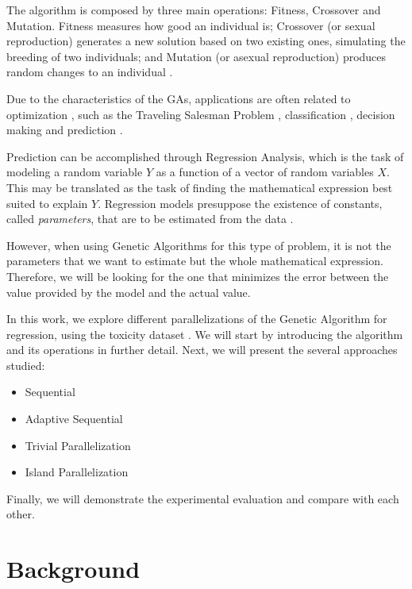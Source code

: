 \documentclass[runningheads]{llncs}
\begin{document}
The algorithm is composed by three main operations: Fitness, Crossover and Mutation. Fitness measures how good an individual is; Crossover (or sexual reproduction) generates a new solution based on two existing ones, simulating the breeding of two individuals; and Mutation (or asexual reproduction) produces random changes to an individual \cite{langdon1995genetic}.

Due to the characteristics of the GAs, applications are often related to optimization \cite{sivanandam2008genetic}, such as the Traveling Salesman Problem \cite{grefenstette1985genetic}, classification \cite{5340522}, decision making \cite{George:2012:GAB:2345396.2345426} and prediction \cite{etemadi2009genetic}.

Prediction can be accomplished through Regression Analysis, which is the task of modeling a random variable $Y$ as a function of a vector of random variables $X$. This may be translated as the task of finding the mathematical expression best suited to explain $Y$. Regression models presuppose the existence of constants, called \textit{parameters}, that are to be estimated from the data \cite{rawlings2001applied}.

However, when using Genetic Algorithms for this type of problem, it is not the parameters that we want to estimate but the whole mathematical expression. Therefore, we will be looking for the one that minimizes the error between the value provided by the model and the actual value.

In this work, we explore different parallelizations of the Genetic Algorithm for regression, using the toxicity dataset \cite{krawiec2013genetic}. We will start by introducing the algorithm and its operations in further detail. Next, we will present the several approaches studied:

\begin{itemize}
\item Sequential
\item Adaptive Sequential
\item Trivial Parallelization
\item Island Parallelization
\end{itemize}

Finally, we will demonstrate the experimental evaluation and compare with each other.

\section{Background}
\end{document}
